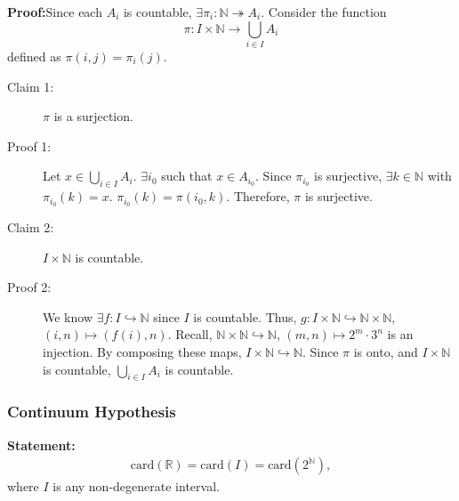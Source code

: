 \documentclass[10pt]{extarticle}
\newcommand{\card}{\text{card}}
\newcommand{\N}{\mathbb{N}}
\newcommand{\R}{\mathbb{R}}
\begin{document}
    \textbf{Proof:}Since each $A_i$ is countable, $\exists \pi_i: \N \twoheadrightarrow A_i$. Consider the function
      \[
        \pi: I\times\N \rightarrow \bigcup_{i\in I}A_i
      \] 
      defined as $\pi(i,j) = \pi_i(j)$.
      \begin{description}
        \item[Claim 1:] $\pi$ is a surjection.
        \item[Proof 1:] Let $x\in \bigcup_{i\in I}A_i$. $\exists i_0$ such that $x\in A_{i_0}$. Since $\pi_{i_0}$ is surjective, $\exists k\in \N$ with $\pi_{i_0}(k) = x$. $\pi_{i_0}(k) = \pi(i_0,k)$. Therefore, $\pi$ is surjective.
        \item[Claim 2:] $I\times\N$ is countable.
        \item[Proof 2:] We know $\exists f: I\hookrightarrow\N$ since $I$ is countable. Thus, $g:I\times\N\hookrightarrow\N\times\N$, $(i,n)\mapsto (f(i),n)$. Recall, $\N\times\N\hookrightarrow \N$, $(m,n)\mapsto 2^m\cdot3^n$ is an injection. By composing these maps, $I\times\N\hookrightarrow\N$. Since $\pi$ is onto, and $I\times\N$ is countable, $\bigcup_{i\in I} A_i$ is countable.
      \end{description}
      \subsubsection{Continuum Hypothesis}%
      \textbf{Statement:}
      \begin{align*}
        \card(\R) = \card(I) = \card(2^{\N}), 
      \end{align*}
      where $I$ is any non-degenerate interval.\\
\end{document}
